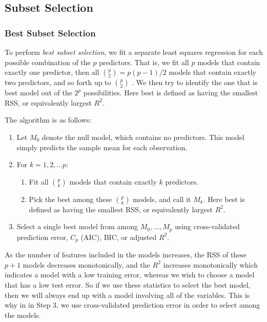 \documentclass{article}
\numberwithin{equation}{section}
\begin{document}
\begin{enumerate}
\begin{enumerate}
\end{enumerate}

\subsection{Subset Selection}
\subsubsection{Best Subset Selection}
To perform \textit{best subset selection}, we fit a separate least squares regression for each possible combination of the $p$ predictors. That is, we fit all $p$ models that contain exactly one predictor, then all $\binom{p}{2}= p(p-1)/2$ models that contain exactly two predictors, and so forth up to $\binom{p}{2}$ . We then try to identify the one that is best model out of the $2^p$ possibilities. Here best is defined as having the smallest RSS, or equivalently largest $R^2$.

The algorithm is as follows:
\begin{enumerate}
    \item Let $M_0$ denote the null model, which contains no predictors. This model simply predicts the sample mean for each observation.
    \item For $k = 1, 2,...p$:
    \begin{enumerate}
        \item Fit all $\binom{p}{k}$ models that contain exactly $k$ predictors.
        \item Pick the best  among these $\binom{p}{k}$ models, and call it $M_k$. Here best is defined as having the smallest RSS, or equivalently largest $R^2$.
    \end{enumerate}
    \item Select a single best model from among $M_0,\dots,M_p$ using cross-validated prediction error, $C_p$ (AIC), BIC, or adjusted $R^2$.
\end{enumerate}

As the number of features included in the models increases, the RSS of these $p + 1$ models decreases monotonically, and the $R^2$ increases monotonically which indicates a model with a low training error, whereas we wish to choose a model that has a low test error. So if we use these statistics to select the best model, then we will always end up with a model involving all of the variables. This is why in in Step 3, we use cross-validated prediction error in order to select among the models.


\end{enumerate}
\end{document}
